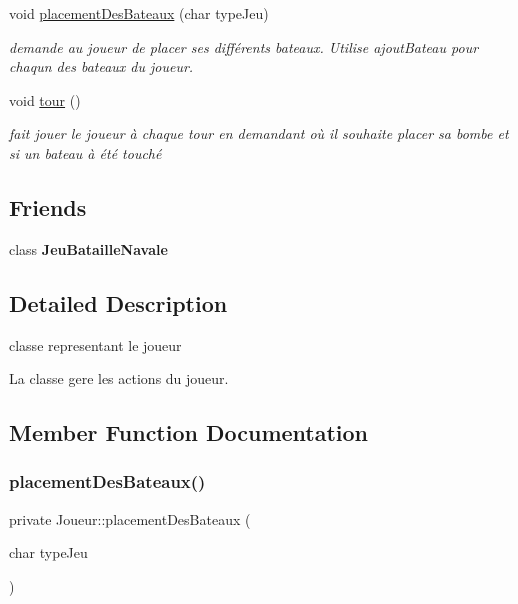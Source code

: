 \begin{DoxyCompactItemize}
void \mbox{\hyperlink{class_joueur_aa97f71a90328693e0047ba2f48d61b4b}{placement\+Des\+Bateaux}} (char type\+Jeu)
\begin{DoxyCompactList}\small\item\em demande au joueur de placer ses différents bateaux. Utilise ajout\+Bateau pour chaqun des bateaux du joueur. \end{DoxyCompactList}\item 
\mbox{\label{class_joueur_a46bdd92b73a1f0d04aeb5f19f33720b0}} 
void \mbox{\hyperlink{class_joueur_a46bdd92b73a1f0d04aeb5f19f33720b0}{tour}} ()
\begin{DoxyCompactList}\small\item\em fait jouer le joueur à chaque tour en demandant où il souhaite placer sa bombe et si un bateau à été touché \end{DoxyCompactList}\end{DoxyCompactItemize}
\subsection*{Friends}
\begin{DoxyCompactItemize}
\item 
\mbox{\label{class_joueur_a5e820295bb9a9381c14f9067e97ca6c1}} 
class {\bfseries Jeu\+Bataille\+Navale}
\end{DoxyCompactItemize}


\subsection{Detailed Description}
classe representant le joueur 

La classe gere les actions du joueur. 

\subsection{Member Function Documentation}
\mbox{\label{class_joueur_aa97f71a90328693e0047ba2f48d61b4b}} 
\subsubsection{\texorpdfstring{placement\+Des\+Bateaux()}{placementDesBateaux()}}
{\footnotesize\ttfamily private Joueur\+::placement\+Des\+Bateaux (\begin{DoxyParamCaption}\item[{char}]{type\+Jeu }\end{DoxyParamCaption})}



